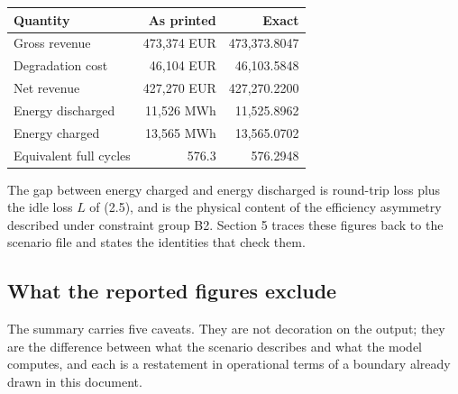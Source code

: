 \documentclass[11pt,a4paper]{article}
\numberwithin{equation}{section}
\begin{document}
\begin{tabular}{@{}lrr@{}}
\toprule
Quantity & As printed & Exact \\
\midrule
Gross revenue           & 473{,}374 EUR & 473{,}373.8047 \\
Degradation cost        & 46{,}104 EUR  & 46{,}103.5848 \\
Net revenue             & 427{,}270 EUR & 427{,}270.2200 \\
Energy discharged       & 11{,}526 MWh  & 11{,}525.8962 \\
Energy charged          & 13{,}565 MWh  & 13{,}565.0702 \\
Equivalent full cycles  & 576.3         & 576.2948 \\
\bottomrule
\end{tabular}

The gap between energy charged and energy discharged is round-trip loss plus the
idle loss $L$ of (2.5), and is the physical content of the efficiency asymmetry
described under constraint group B2. Section 5 traces these figures back to the
scenario file and states the identities that check them.

\subsection{What the reported figures exclude}

The summary carries five caveats. They are not decoration on the output; they
are the difference between what the scenario describes and what the model
computes, and each is a restatement in operational terms of a boundary already
drawn in this document.
\end{document}
